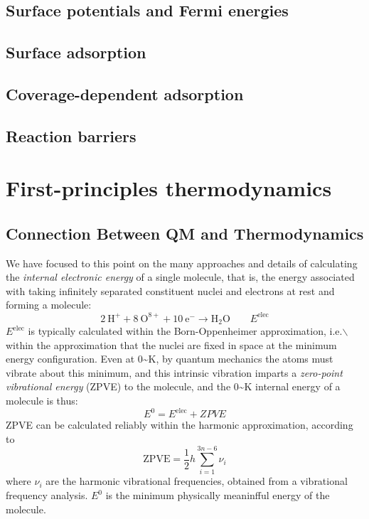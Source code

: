 \documentclass[11pt]{article}
\begin{document}
\subsection{Surface potentials and Fermi energies}
\label{sec:orgbcc4fdf}
\subsection{Surface adsorption}
\label{sec:orgc190487}
\subsection{Coverage-dependent adsorption}
\label{sec:org6daad68}
\subsection{Reaction barriers}
\label{sec:orgaa9f939}

\newpage
\section{First-principles thermodynamics}
\label{sec:org1973354}
\subsection{Connection Between QM and Thermodynamics}
\label{sec:orgfa2dbfd}
We have focused to this point on the many approaches and details of calculating
the \emph{internal electronic energy} of a single molecule, that is, the energy
associated with taking infinitely separated constituent nuclei and electrons at
rest and forming a molecule:
\begin{equation}
2~\mathrm{H}^+ + 8~\mathrm{O}^{8+} + 10~\mathrm{e}^- \rightarrow
\mathrm{H_2O}\qquad E^\mathrm{elec}
\end{equation}
\(E^\mathrm{elec}\) is typically calculated within the Born-Oppenheimer
approximation, i.e.$\backslash$ within the approximation that the nuclei are fixed in space
at the minimum energy configuration.  Even at 0\textasciitilde{}K, by quantum mechanics the
atoms must vibrate about this minimum, and this intrinsic vibration imparts a
\emph{zero-point vibrational energy} (ZPVE) to the molecule, and the 0\textasciitilde{}K
internal energy of a molecule is thus:
\begin{equation}
  E^0=E^\mathrm{elec} + ZPVE
\end{equation}
ZPVE can be calculated reliably within the harmonic approximation, according to
\begin{equation}
  \mathrm{ZPVE}=\frac{1}{2}h\sum_{i=1}^{3n-6}\nu_i
\end{equation}
where \(\nu_i\) are the harmonic vibrational frequencies, obtained from a
vibrational frequency analysis.  \(E^0\) is the minimum physically meaninfful
energy of the molecule.
\end{document}
